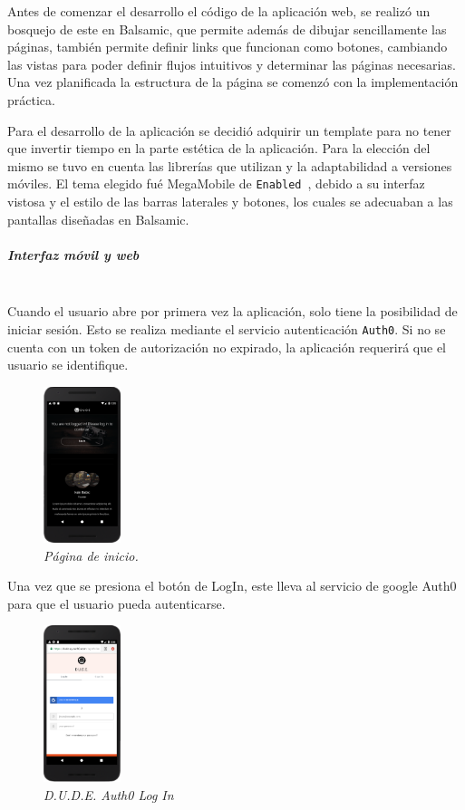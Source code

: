 Antes de comenzar el desarrollo el código de la aplicación web, se realizó un bosquejo de este en Balsamic, que permite además de dibujar sencillamente las páginas, también permite definir links que funcionan como botones, cambiando las vistas para poder definir flujos intuitivos y determinar las páginas necesarias. Una vez planificada la estructura de la página se comenzó con la implementación práctica.

Para el desarrollo de la aplicación se decidió adquirir un template para no tener que invertir tiempo en la parte estética de la aplicación. Para la elección del mismo se tuvo en cuenta las librerías que utilizan y la adaptabilidad a versiones móviles.
El tema elegido fué MegaMobile de \lstinline[columns=fixed]{Enabled}~\cite{Enabled}, debido a su interfaz vistosa y el estilo de las barras laterales y botones, los cuales se adecuaban a las pantallas diseñadas en Balsamic.

\subparagraph{Interfaz móvil y web}\mbox{}\\
Cuando el usuario abre por primera vez la aplicación, solo tiene la posibilidad de iniciar sesión. Esto se realiza mediante el servicio autenticación \lstinline[columns=fixed]{Auth0}. Si no se cuenta con un token de autorización no expirado, la aplicación requerirá que el usuario se identifique.

\begin{figure}[H]
  \centering
  \includegraphics[width=0.2\textwidth, keepaspectratio]{images/app-movil-home}
  \caption{\textit{Página de inicio.}}
  \label{fig:app-movil-home}
\end{figure}

Una vez que se presiona el botón de LogIn, este lleva al servicio de google Auth0 para que el usuario pueda autenticarse.


\begin{figure}[H]
  \centering
  \includegraphics[width=0.2\textwidth, keepaspectratio]{images/app-movil-auth0}
  \caption{\textit{D.U.D.E. Auth0 Log In}}
  \label{fig:app-movil-auth0}
\end{figure}

